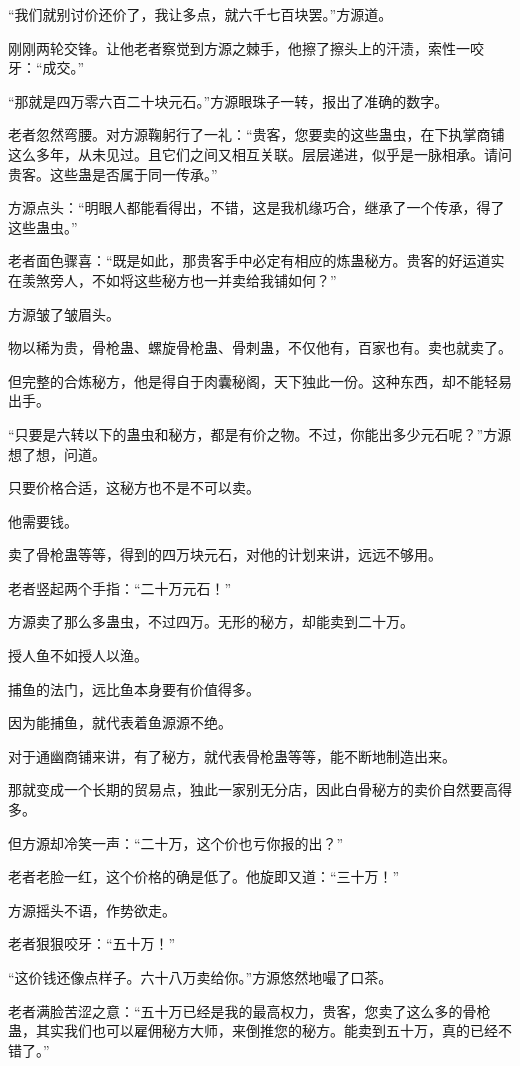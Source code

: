 \begin{this_body}
“我们就别讨价还价了，我让多点，就六千七百块罢。”方源道。

刚刚两轮交锋。让他老者察觉到方源之棘手，他擦了擦头上的汗渍，索性一咬牙：“成交。”

“那就是四万零六百二十块元石。”方源眼珠子一转，报出了准确的数字。

老者忽然弯腰。对方源鞠躬行了一礼：“贵客，您要卖的这些蛊虫，在下执掌商铺这么多年，从未见过。且它们之间又相互关联。层层递进，似乎是一脉相承。请问贵客。这些蛊是否属于同一传承。”

方源点头：“明眼人都能看得出，不错，这是我机缘巧合，继承了一个传承，得了这些蛊虫。”

老者面色骤喜：“既是如此，那贵客手中必定有相应的炼蛊秘方。贵客的好运道实在羡煞旁人，不如将这些秘方也一并卖给我铺如何？”

方源皱了皱眉头。

物以稀为贵，骨枪蛊、螺旋骨枪蛊、骨刺蛊，不仅他有，百家也有。卖也就卖了。

但完整的合炼秘方，他是得自于肉囊秘阁，天下独此一份。这种东西，却不能轻易出手。

“只要是六转以下的蛊虫和秘方，都是有价之物。不过，你能出多少元石呢？”方源想了想，问道。

只要价格合适，这秘方也不是不可以卖。

他需要钱。

卖了骨枪蛊等等，得到的四万块元石，对他的计划来讲，远远不够用。

老者竖起两个手指：“二十万元石！”

方源卖了那么多蛊虫，不过四万。无形的秘方，却能卖到二十万。

授人鱼不如授人以渔。

捕鱼的法门，远比鱼本身要有价值得多。

因为能捕鱼，就代表着鱼源源不绝。

对于通幽商铺来讲，有了秘方，就代表骨枪蛊等等，能不断地制造出来。

那就变成一个长期的贸易点，独此一家别无分店，因此白骨秘方的卖价自然要高得多。

但方源却冷笑一声：“二十万，这个价也亏你报的出？”

老者老脸一红，这个价格的确是低了。他旋即又道：“三十万！”

方源摇头不语，作势欲走。

老者狠狠咬牙：“五十万！”

“这价钱还像点样子。六十八万卖给你。”方源悠然地嘬了口茶。

老者满脸苦涩之意：“五十万已经是我的最高权力，贵客，您卖了这么多的骨枪蛊，其实我们也可以雇佣秘方大师，来倒推您的秘方。能卖到五十万，真的已经不错了。”


\end{this_body}
